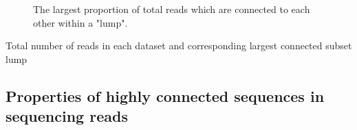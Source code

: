 \documentclass[11pt]{article} %
\begin{document}
\begin{figure}
\caption{The largest proportion of total reads which are connected to each other within a "lump".}
\end{figure}

\begin{table}
\caption{Total number of reads in each dataset and corresponding largest connected subset lump}
\end{table}


\subsection{Properties of highly connected sequences in sequencing reads}
\end{document}
